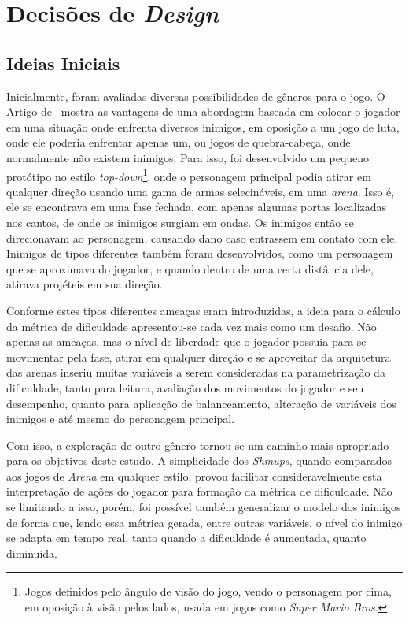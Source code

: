 
\chapter{Decisões de \textit{Design}}
\label{cap:processo de desenvolvimento}
\section{Ideias Iniciais}

Inicialmente, foram avaliadas diversas possibilidades de gêneros para o jogo. O Artigo de~\citet{DynamicDiffAdjustment} mostra as vantagens de uma abordagem baseada em colocar o jogador em uma situação onde enfrenta diversos inimigos, em oposição a um jogo de luta, onde ele poderia enfrentar apenas um, ou jogos de quebra-cabeça, onde normalmente não existem inimigos. Para isso, foi desenvolvido um pequeno protótipo no estilo \textit{top-down}\footnote{
    Jogos definidos pelo ângulo de visão do jogo, vendo o personagem por cima, em oposição à visão pelos lados, usada em jogos como \textit{Super Mario Bros}.
}, onde o personagem principal podia atirar em qualquer direção usando uma gama de armas selecináveis, em uma \textit{arena}. Isso é, ele se encontrava em uma fase fechada, com apenas algumas portas localizadas nos cantos, de onde os inimigos surgiam em ondas. Os inimigos então se direcionavam ao personagem, causando dano caso entrassem em contato com ele. Inimigos de tipos diferentes também foram desenvolvidos, como um personagem que se aproximava do jogador, e quando dentro de uma certa distância dele, atirava projéteis em sua direção.

Conforme estes tipos diferentes ameaças eram introduzidas, a ideia para o cálculo da métrica de dificuldade apresentou-se cada vez mais como um desafio. Não apenas as ameaças, mas o nível de liberdade que o jogador possuia para se movimentar pela fase, atirar em qualquer direção e se aproveitar da arquitetura das arenas inseriu muitas variáveis a serem consideradas na parametrização da dificuldade, tanto para leitura, avaliação dos movimentos do jogador e seu desempenho, quanto para aplicação de balanceamento, alteração de variáveis dos inimigos e até mesmo do personagem principal.

Com isso, a exploração de outro gênero tornou-se um caminho mais apropriado para os objetivos deste estudo. A simplicidade dos \textit{Shmups}, quando comparados aos jogos de \textit{Arena} em qualquer estilo, provou facilitar consideravelmente esta interpretação de ações do jogador para formação da métrica de dificuldade. Não se limitando a isso, porém, foi possível também generalizar o modelo dos inimigos de forma que, lendo essa métrica gerada, entre outras variáveis, o nível do inimigo se adapta em tempo real, tanto quando a dificuldade é aumentada, quanto diminuída.

